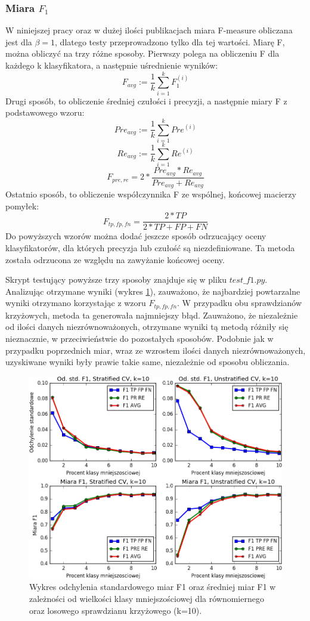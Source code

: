 \subsubsection{Miara $F_1$}
W niniejszej pracy oraz w dużej ilości publikacjach miara F-measure obliczana jest dla $\beta=1$, dlatego testy przeprowadzono tylko dla tej wartości. Miarę F, można obliczyć na trzy różne sposoby. Pierwszy polega na obliczeniu F dla każdego k klasyfikatora, a następnie uśrednienie wyników:
\[F_{avg} := \frac{1}{k} \sum_{i=1}^{k} F_1^{(i)}\]
Drugi sposób, to obliczenie średniej czułości i precyzji, a następnie miary F z podstawowego wzoru:
\[Pre_{avg} := \frac{1}{k} \sum_{i=1}^{k} Pre^{(i)}\]
\[Re_{avg} := \frac{1}{k} \sum_{i=1}^{k} Re^{(i)}\]
\[F_{pre, re} = 2 * \frac{Pre_{avg}*Re_{avg}}{Pre_{avg}+Re_{avg}} \]
Ostatnio sposób, to obliczenie współczynnika F ze wspólnej, końcowej macierzy pomyłek:
\[F_{tp, fp, fn} = \frac{2*TP}{2*TP+FP+FN} \]
Do powyższych wzorów można dodać jeszcze sposób odrzucający oceny klasyfikatorów, dla których precyzja lub czułość są niezdefiniowane. Ta metoda została odrzucona ze względu na zawyżanie końcowej oceny. \par 
Skrypt testujący powyższe trzy sposoby znajduje się w pliku $test\_f1.py$. Analizując otrzymane wyniki (wykres \ref{fig:wykresf1}), zauważono, że najbardziej powtarzalne wyniki otrzymano korzystając z wzoru $F_{tp, fp, fn}$. W przypadku obu sprawdzianów krzyżowych, metoda ta generowała najmniejszy błąd. Zauważono, że niezależnie od ilości danych niezrównoważonych, otrzymane wyniki tą metodą różniły się nieznacznie, w przeciwieństwie do pozostałych sposobów. Podobnie jak w przypadku poprzednich miar, wraz ze wzrostem ilości danych niezrównoważonych, uzyskiwane wyniki były prawie takie same, niezależnie od sposobu obliczania.
\begin{figure}[H]
	\centering
	\includegraphics[width=\textwidth]{./images/miara-F1.png}
	\caption{Wykres odchylenia standardowego miar F1 oraz średniej miar F1 w zależności od wielkości klasy mniejszościowej dla równomiernego oraz losowego sprawdzianu krzyżowego (k=10).}
	\label{fig:wykresf1}
\end{figure}

